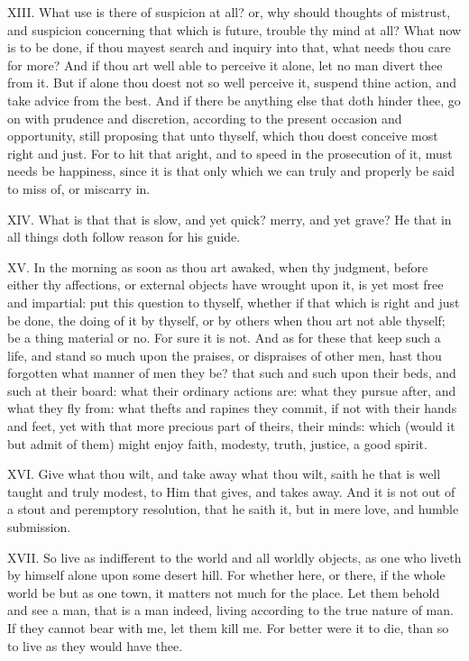 XIII. What use is there of suspicion at all? or, why should thoughts
of mistrust, and suspicion concerning that which is future, trouble thy
mind at all? What now is to be done, if thou mayest search and inquiry
into that, what needs thou care for more? And if thou art well able to
perceive it alone, let no man divert thee from it. But if alone thou doest
not so well perceive it, suspend thine action, and take advice from the
best. And if there be anything else that doth hinder thee, go on with
prudence and discretion, according to the present occasion and
opportunity, still proposing that unto thyself, which thou doest conceive
most right and just. For to hit that aright, and to speed in the
prosecution of it, must needs be happiness, since it is that only which we
can truly and properly be said to miss of, or miscarry in.

XIV. What is that that is slow, and yet quick? merry, and yet grave? He
that in all things doth follow reason for his guide.

XV. In the morning as soon as thou art awaked, when thy judgment, before
either thy affections, or external objects have wrought upon it, is yet
most free and impartial: put this question to thyself, whether if that
which is right and just be done, the doing of it by thyself, or by others
when thou art not able thyself; be a thing material or no. For sure it is
not. And as for these that keep such a life, and stand so much upon the
praises, or dispraises of other men, hast thou forgotten what manner of
men they be? that such and such upon their beds, and such at their board:
what their ordinary actions are: what they pursue after, and what they fly
from: what thefts and rapines they commit, if not with their hands and
feet, yet with that more precious part of theirs, their minds: which
(would it but admit of them) might enjoy faith, modesty, truth, justice, a
good spirit.

XVI. Give what thou wilt, and take away what thou wilt, saith he that is
well taught and truly modest, to Him that gives, and takes away. And it is
not out of a stout and peremptory resolution, that he saith it, but in
mere love, and humble submission.

XVII. So live as indifferent to the world and all worldly objects, as
one who liveth by himself alone upon some desert hill. For whether here,
or there, if the whole world be but as one town, it matters not much for
the place. Let them behold and see a man, that is a man indeed, living
according to the true nature of man. If they cannot bear with me, let them
kill me. For better were it to die, than so to live as they would have
thee.

